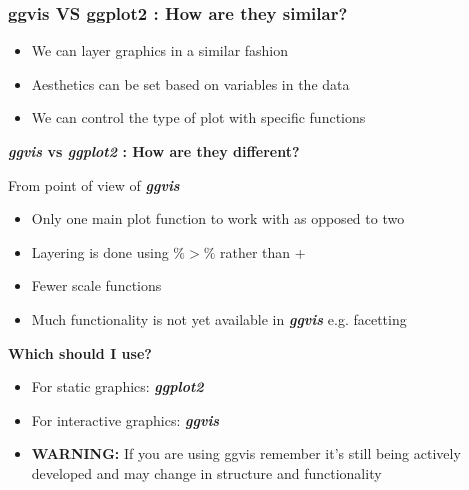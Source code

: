\documentclass[MASTER.tex]{subfiles}
\begin{document}
\begin{frame}[fragile]
\frametitle{ggvis VS ggplot2 : How are they similar?}
\Large
\begin{itemize}
\item We can layer graphics in a similar fashion
\item Aesthetics can be set based on variables in the
data
\item We can control the type of plot with specific
functions
\end{itemize}
\end{frame}
\begin{frame}
	\Large
\textbf{\textit{ggvis} vs \textit{ggplot2} : How are they different?} \\ \bigskip

From point of view of \textbf{\textit{ggvis}}
\begin{itemize}
\item Only one main plot function to work with as
opposed to two
\item Layering is done using $ \%>\% $ rather than +
\item Fewer scale functions
\item Much functionality is not yet available in \textbf{\textit{ggvis}} e.g.
facetting
\end{itemize}

\end{frame}
\begin{frame}
	\Large
\textbf{Which should I use?}
\begin{itemize}
\item For static graphics: \textbf{\textit{ggplot2}}
\item For interactive graphics: \textbf{\textit{ggvis}}
\item \textbf{WARNING:} If you are using ggvis remember it's still being actively
developed and may change in structure and functionality
\end{itemize}
\end{frame}
\end{document}
